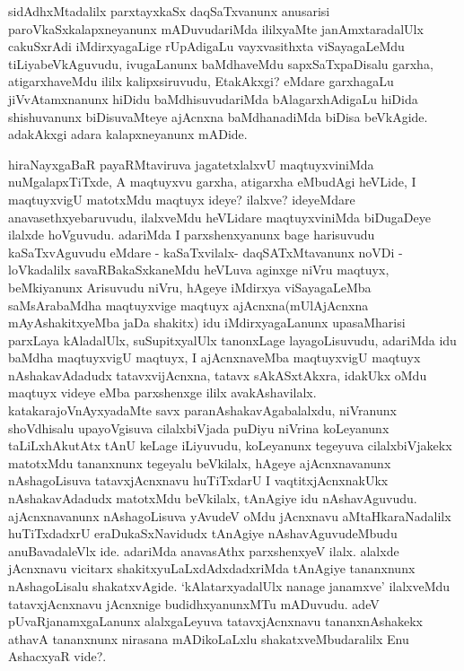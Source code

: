 \begin{artha}
sidAdhxMtadalilx parxtayxkaSx daqSaTxvanunx anusarisi paroVkaSxkalapxneyanunx mADuvuda\-riMda ililxyaMte janAmxtaradalUlx cakuSxrAdi iMdirxyagaLige rUpAdigaLu vayxvasithxta viSayagaLeMdu tiLiyabeVkAguvudu, ivugaLanunx baMdhaveMdu sapxSaTxpaDisalu garxha, atigarxhaveMdu ililx kalipxsiruvudu, EtakAkxgi? eMdare garxhagaLu jiVvAtamxnanunx hiDidu baMdhisuvudariMda bAlagarxhAdigaLu hiDida shishuvanunx biDisuvaMteye ajAcnxna baMdhanadiMda biDisa beVkAgide. adakAkxgi adara kalapxneyanunx mADide. 
\end{artha}

\centerline{}

\begin{artha}
hiraNayxgaBaR payaRMtaviruva jagatetxlalxvU maqtuyxviniMda nuMgalapxTiTxde, A \-maqtuyxvu garxha, atigarxha eMbudAgi heVLide, I maqtuyxvigU matotxMdu \-maqtuyx ideye? ilalxve? ideyeMdare anavasethxyebaruvudu, ilalxveMdu heVLidare maqtuyxviniMda biDugaDeye ilalxde hoVguvudu. adariMda I parxshenx\-yanunx bage harisuvudu kaSaTxvAguvudu eMdare - kaSaTxvilalx- daqSATxMtavanunx noVDi - loVkadalilx savaRBakaSxkaneMdu heVLuva aginxge niVru maqtuyx, beMkiyanunx Ari\-suvudu niVru, hAgeye iMdirxya viSayagaLeMba saMsArabaMdha maqtuyxvige maqtuyx ajAcnxna(mUlAjAcnxna mAyAshakitxyeMba jaDa shakitx) idu iMdirxyagaLanunx upasaMharisi parxLaya kAladalUlx, suSupitxyalUlx tanonxLage layagoLisuvudu, adariMda idu baMdha maqtuyxvigU maqtuyx, I ajAcnxnaveMba maqtuyxvigU maqtuyx nAshakavAdadudx tatavxvijAcnxna, tatavx sAkASxtAkxra, idakUkx oMdu maqtuyx videye eMba parxshenxge ililx avakAshavilalx. katakarajoVnAyxyadaMte savx paranAshakavAgabalalxdu, niVranunx shoVdhisalu upayoVgisuva cilalxbiVjada puDiyu niVrina koLeyanunx taLiLxhAkutAtx tAnU keLage iLiyuvudu, koLeyanunx tegeyuva cilalxbiVjakekx matotxMdu tananxnunx tegeyalu beVkilalx, hAgeye ajAcnxnavanunx nAshagoLisuva tatavxjAcnxnavu huTiTxdarU I vaqtitxjAcnxnakUkx nAshakavAdadudx matotxMdu beVkilalx, tAnAgiye idu nAshavAguvudu. ajAcnxnavanunx nAshagoLisuva yAvudeV oMdu jAcnxnavu aMtaHkaraNadalilx huTiTxdadxrU eraDukaSxNavidudx tAnAgiye nAshavAguvudeMbudu anuBavadaleVlx ide. adariMda anavasAthx parxshenxyeV ilalx. alalxde jAcnxnavu vicitarx shakitxyuLaLxdAdxdadxriMda tAnAgiye tananxnunx nAshagoLisalu shakatxvAgide. `kAlatarxyadalUlx nanage janamxve' ilalxveMdu tatavxjAcnxnavu jAcnxnige budidhxyanunxMTu mADuvudu. adeV pUvaRjanamxgaLanunx alalxgaLeyuva tatavxjAcnxnavu tananxnAshakekx athavA tananxnunx nirasana mADikoLaLxlu shakatxveMbudaralilx Enu AshacxyaR vide?.
\end{artha}

